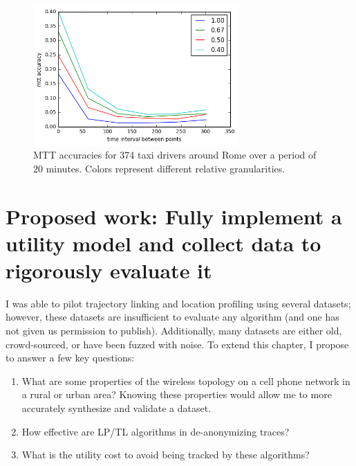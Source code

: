 \begin{figure}\begin{center}
	\includegraphics[width=0.7\textwidth]{graphics/mtt}
	\caption{MTT accuracies for 374 taxi drivers around Rome over a period of 20 minutes. Colors represent different relative granularities.}
	\label{fig:mtt}
\end{center}\end{figure}



\section{Proposed work: Fully implement a utility model and collect data to rigorously evaluate it}

I was able to pilot trajectory linking and location profiling using several datasets; however, these datasets are insufficient to evaluate any algorithm (and one has not given us permission to publish). Additionally, many datasets are either old, crowd-sourced, or have been fuzzed with noise. To extend this chapter, I propose to answer a few key questions:
\begin{enumerate}
	\item What are some properties of the wireless topology on a cell phone network in a rural or urban area? Knowing these properties would allow me to more accurately synthesize and validate a dataset.
	\item How effective are LP/TL algorithms in de-anonymizing traces?
	\item What is the utility cost to avoid being tracked by these algorithms?
\end{enumerate}

